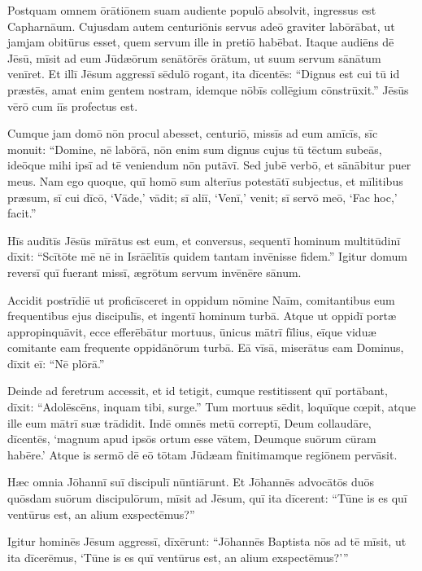 \Caput
\Versus Postquam omnem ōrātiōnem suam audiente populō absolvit, ingressus est Caphar\-nāum.
\Versus Cujusdam autem centuriōnis servus adeō graviter labōrābat, ut jamjam obitūrus esset, quem servum ille in pretiō habēbat.
\Versus Itaque audiēns dē Jēsū, mīsit ad eum Jūdæōrum senātōrēs ōrātum, ut suum servum sānātum venīret.
\Versus Et illī Jēsum aggressī sēdulō rogant, ita dīcentēs: ``Dignus est cui tū id præstēs,
\Versus amat enim gentem nostram, idemque nōbīs collēgium cōnstrūxit.''
\Versus Jēsūs vērō cum iīs profectus est.

Cumque jam domō nōn procul abesset, centuriō, missīs ad eum amīcīs, sīc monuit: ``Domine, nē labōrā, nōn enim sum dignus cujus tū tēctum subeās,
\Versus ideōque mihi ipsī ad tē veniendum nōn putāvī. Sed jubē verbō, et sānābitur puer meus.
\Versus Nam ego quoque, quī homō sum alterīus potestātī subjectus, et mīlitibus præsum, sī cui dīcō, `Vāde,' vādit; sī aliī, `Venī,' venit; sī servō meō, `Fac hoc,' facit.''

\Versus Hīs audītīs Jēsūs mīrātus est eum, et conversus, sequentī hominum multitūdinī dīxit: ``Scītōte mē nē in Isrāēlītīs quidem tantam invēnisse fidem.''
\Versus Igitur domum reversī quī fuerant missī, ægrōtum servum invēnēre sānum.

\Versus Accidit postrīdiē ut proficīsceret in oppidum nōmine Naīm, comitantibus eum frequentibus ejus discipulīs, et ingentī hominum turbā.
\Versus Atque ut oppidī portæ appropinquāvit, ecce efferēbātur mortuus, ūnicus mātrī fīlius, eīque viduæ comitante eam frequente oppidānōrum turbā.
\Versus Eā vīsā, miserātus eam Dominus, dīxit eī: ``Nē plōrā.''

\Versus Deinde ad feretrum accessit, et id tetigit, cumque restitissent quī portābant, dīxit: ``Adolēscēns, inquam tibi, surge.''
\Versus Tum mortuus sēdit, loquīque cœpit, atque ille eum mātrī suæ trādidit.
\Versus Indē omnēs metū correptī, Deum collaudāre, dīcentēs, `magnum apud ipsōs ortum esse vātem, Deumque suōrum cūram habēre.'
\Versus Atque is sermō dē eō tōtam Jūdæam fīnitimamque regiōnem pervāsit.

\Versus Hæc omnia Jōhannī suī discipulī nūntiārunt.
\Versus Et Jōhannēs advocātōs duōs quōs\-dam suōrum discipulōrum, mīsit ad Jēsum, quī ita dīcerent: ``Tūne is es quī ventūrus est, an alium exspectēmus?''

\Versus Igitur hominēs Jēsum aggressī, dīxērunt: ``Jōhannēs Baptista nōs ad tē mīsit, ut ita dīcerēmus, `Tūne is es quī ventūrus est, an alium exspectēmus?'{}''

